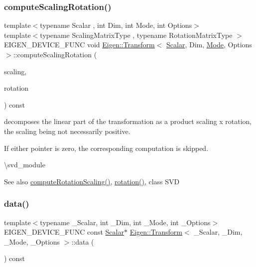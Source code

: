 \subsubsection{\texorpdfstring{computeScalingRotation()}{computeScalingRotation()}}
{\footnotesize\ttfamily template$<$typename Scalar , int Dim, int Mode, int Options$>$ \\
template$<$typename Scaling\+Matrix\+Type , typename Rotation\+Matrix\+Type $>$ \\
E\+I\+G\+E\+N\+\_\+\+D\+E\+V\+I\+C\+E\+\_\+\+F\+U\+NC void \mbox{\hyperlink{class_eigen_1_1_transform}{Eigen\+::\+Transform}}$<$ \mbox{\hyperlink{class_eigen_1_1_transform_a4e69ced9d651745b8ed4eda46f41795d}{Scalar}}, Dim, \mbox{\hyperlink{struct_mode}{Mode}}, Options $>$\+::compute\+Scaling\+Rotation (\begin{DoxyParamCaption}\item[{Scaling\+Matrix\+Type $\ast$}]{scaling,  }\item[{Rotation\+Matrix\+Type $\ast$}]{rotation }\end{DoxyParamCaption}) const}

decomposes the linear part of the transformation as a product scaling x rotation, the scaling being not necessarily positive.

If either pointer is zero, the corresponding computation is skipped.

\textbackslash{}svd\+\_\+module

\begin{DoxySeeAlso}{See also}
\mbox{\hyperlink{class_eigen_1_1_transform_aff2a75622ed0a24dbe4bd22e5aeccb78}{compute\+Rotation\+Scaling()}}, \mbox{\hyperlink{class_eigen_1_1_transform_a87eb429e076e2c15a1bfbe99b43ae07c}{rotation()}}, class S\+VD 
\end{DoxySeeAlso}
\mbox{\label{class_eigen_1_1_transform_a75c33d8e3769936887149c9fca3e709f}} 
\subsubsection{\texorpdfstring{data()}{data()}\hspace{0.1cm}{\footnotesize\ttfamily [1/2]}}
{\footnotesize\ttfamily template$<$typename \+\_\+\+Scalar, int \+\_\+\+Dim, int \+\_\+\+Mode, int \+\_\+\+Options$>$ \\
E\+I\+G\+E\+N\+\_\+\+D\+E\+V\+I\+C\+E\+\_\+\+F\+U\+NC const \mbox{\hyperlink{class_eigen_1_1_transform_a4e69ced9d651745b8ed4eda46f41795d}{Scalar}}$\ast$ \mbox{\hyperlink{class_eigen_1_1_transform}{Eigen\+::\+Transform}}$<$ \+\_\+\+Scalar, \+\_\+\+Dim, \+\_\+\+Mode, \+\_\+\+Options $>$\+::data (\begin{DoxyParamCaption}{ }\end{DoxyParamCaption}) const\hspace{0.3cm}{\ttfamily [inline]}}

